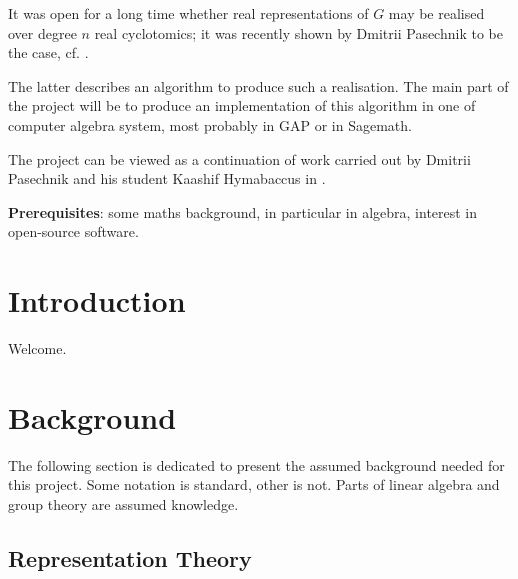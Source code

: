\documentclass[11pt]{article}
\begin{document}
It was open for a long time whether real representations of $G$ may be realised
over degree $n$ real cyclotomics; it was recently shown by Dmitrii Pasechnik to be
the case, cf. \cite{Pas21}.

The latter describes an algorithm to produce such a realisation. The main part of the
project will be to produce an implementation of this algorithm in one of computer
algebra system, most probably in GAP or in Sagemath.

The project can be viewed as a continuation of work carried out by Dmitrii Pasechnik
and his student Kaashif Hymabaccus in \cite{Hymabaccus2020}.

\textbf{Prerequisites}: some maths background, in particular in algebra, interest in open-source software.

\newpage

\tableofcontents

\newpage

\section{Introduction}

Welcome.

\newpage

\section{Background}

The following section is dedicated to present the assumed background needed for this project.
Some notation is standard, other is not. Parts of linear algebra and group theory are assumed knowledge.

\subsection{Representation Theory}
\end{document}
